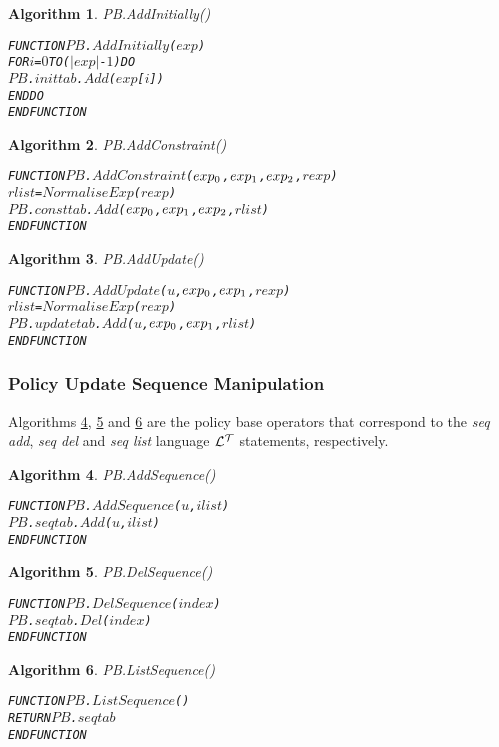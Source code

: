 \documentclass[11pt]{report}
\newenvironment{vverbatim}
{
  \begin{alltt}
}
{
    \vspace{-\baselineskip}
  \end{alltt}
}
\newtheorem{vvalgorithm}{Algorithm}[chapter]
\newenvironment{valgorithm}[2]
{
  \begin{vvalgorithm}{#1}
    \label{#2}
    \small
    \begin{vverbatim}
}
{
    \end{vverbatim}
  \end{vvalgorithm}
}
\begin{document}
          \begin{valgorithm}{PB.AddInitially()}{algo-impln-adini}
FUNCTION \(PB\).\(AddInitially\)(\(exp\))
  FOR \(i\) = \(0\) TO (\(|exp|\) - \(1\)) DO
    \(PB\).\(inittab\).\(Add\)(\(exp\)[\(i\)])
  ENDDO
ENDFUNCTION
          \end{valgorithm}

          \begin{valgorithm}{PB.AddConstraint()}{algo-impln-adcon}
FUNCTION \(PB\).\(AddConstraint\)(\(exp\sb{0}\), \(exp\sb{1}\), \(exp\sb{2}\), \(rexp\))
  \(rlist\) = \(NormaliseExp\)(\(rexp\))
  \(PB\).\(consttab\).\(Add\)(\(exp\sb{0}\), \(exp\sb{1}\), \(exp\sb{2}\), \(rlist\))
ENDFUNCTION
          \end{valgorithm}

          \begin{valgorithm}{PB.AddUpdate()}{algo-impln-adupd}
FUNCTION \(PB\).\(AddUpdate\)(\(u\), \(exp\sb{0}\), \(exp\sb{1}\), \(rexp\))
  \(rlist\) = \(NormaliseExp\)(\(rexp\))
  \(PB\).\(updatetab\).\(Add\)(\(u\), \(exp\sb{0}\), \(exp\sb{1}\), \(rlist\))
ENDFUNCTION
          \end{valgorithm}

        \subsubsection{Policy Update Sequence Manipulation}

          Algorithms \ref{algo-impln-adseq}, \ref{algo-impln-deseq} and
          \ref{algo-impln-lsseq} are the policy base operators that correspond
          to the {\em seq add}, {\em seq del} and {\em seq list} language
          ${\cal L^T}$ statements, respectively.

          \begin{valgorithm}{PB.AddSequence()}{algo-impln-adseq}
FUNCTION \(PB\).\(AddSequence\)(\(u\), \(ilist\))
  \(PB\).\(seqtab\).\(Add\)(\(u\), \(ilist\))
ENDFUNCTION
          \end{valgorithm}

          \begin{valgorithm}{PB.DelSequence()}{algo-impln-deseq}
FUNCTION \(PB\).\(DelSequence\)(\(index\))
  \(PB\).\(seqtab\).\(Del\)(\(index\))
ENDFUNCTION
          \end{valgorithm}

          \begin{valgorithm}{PB.ListSequence()}{algo-impln-lsseq}
FUNCTION \(PB\).\(ListSequence\)(\(\))
  RETURN \(PB\).\(seqtab\)
ENDFUNCTION
          \end{valgorithm}
\end{document}
